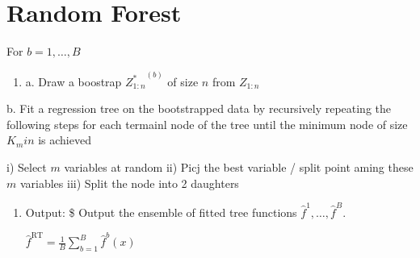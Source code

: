 \documentclass[11pt]{article}
\begin{document}
\section{Random Forest}
\label{sec:orgheadline6}


\begin{algorithm}
For \(b = 1, \ldots, B\)
\begin{enumerate}
\item a. Draw a boostrap \({Z_{1:n}^*}^{(b)}\) of size \(n\) from \(Z_{1:n}\)
\end{enumerate}
b. Fit a regression tree on the bootstrapped data by recursively repeating the following steps for each termainl node of the tree until the minimum node of size \(K_min\) is achieved

i) Select \(m\) variables at random
ii) Picj the best variable / split point aming these \(m\) variables
iii) Split the node into 2 daughters

\begin{enumerate}
\item Output: \$
Output the ensemble of fitted tree functions \(\hat f^1, \ldots, \hat f^B\).

\(\hat f^{\text{RT}} = \frac1B \sum_{b=1}^B \hat f^b(x)\)
\end{enumerate}
\label{orgspecialblock6}

\end{algorithm}
\end{document}
